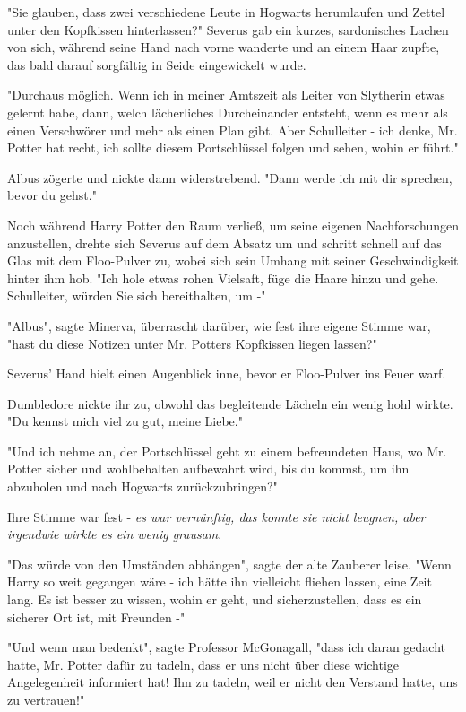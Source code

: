 {"Sie glauben, dass zwei verschiedene Leute in Hogwarts herumlaufen und Zettel unter den Kopfkissen hinterlassen?" Severus gab ein kurzes, sardonisches Lachen von sich, während seine Hand nach vorne wanderte und an einem Haar zupfte, das bald darauf sorgfältig in Seide eingewickelt wurde.

"Durchaus möglich. Wenn ich in meiner Amtszeit als Leiter von Slytherin etwas gelernt habe, dann, welch lächerliches Durcheinander entsteht, wenn es mehr als einen Verschwörer und mehr als einen Plan gibt. Aber Schulleiter - ich denke, Mr. Potter hat recht, ich sollte diesem Portschlüssel folgen und sehen, wohin er führt."

Albus zögerte und nickte dann widerstrebend. "Dann werde ich mit dir sprechen, bevor du gehst."

Noch während Harry Potter den Raum verließ, um seine eigenen Nachforschungen anzustellen, drehte sich Severus auf dem Absatz um und schritt schnell auf das Glas mit dem Floo-Pulver zu, wobei sich sein Umhang mit seiner Geschwindigkeit hinter ihm hob. "Ich hole etwas rohen Vielsaft, füge die Haare hinzu und gehe. Schulleiter, würden Sie sich bereithalten, um -"

"Albus", sagte Minerva, überrascht darüber, wie fest ihre eigene Stimme war, "hast du diese Notizen unter Mr. Potters Kopfkissen liegen lassen?"

Severus' Hand hielt einen Augenblick inne, bevor er Floo-Pulver ins Feuer warf.

Dumbledore nickte ihr zu, obwohl das begleitende Lächeln ein wenig hohl wirkte. "Du kennst mich viel zu gut, meine Liebe."

"Und ich nehme an, der Portschlüssel geht zu einem befreundeten Haus, wo Mr. Potter sicher und wohlbehalten aufbewahrt wird, bis du kommst, um ihn abzuholen und nach Hogwarts zurückzubringen?"

Ihre Stimme war fest - \emph{es war vernünftig, das konnte sie nicht leugnen, aber irgendwie wirkte es ein wenig grausam}.

"Das würde von den Umständen abhängen", sagte der alte Zauberer leise. "Wenn Harry so weit gegangen wäre - ich hätte ihn vielleicht fliehen lassen, eine Zeit lang. Es ist besser zu wissen, wohin er geht, und sicherzustellen, dass es ein sicherer Ort ist, mit Freunden -"

"Und wenn man bedenkt", sagte Professor McGonagall, "dass ich daran gedacht hatte, Mr. Potter dafür zu tadeln, dass er uns nicht über diese wichtige Angelegenheit informiert hat! Ihn zu tadeln, weil er nicht den Verstand hatte, uns zu vertrauen!"

}
